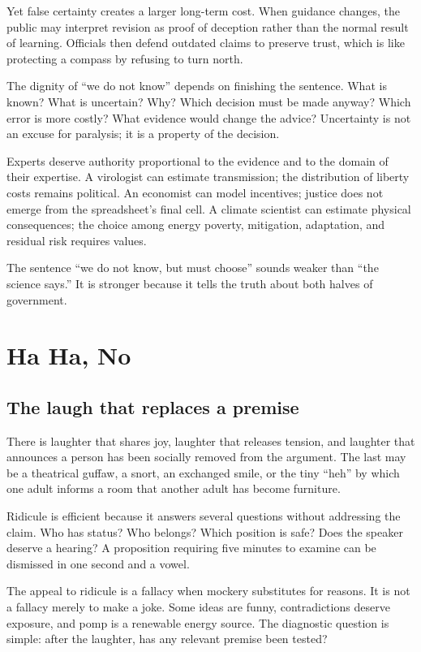 \documentclass[12pt,a4paper]{book}
\begin{document}
Yet false certainty creates a larger long-term cost.  When guidance changes,
the public may interpret revision as proof of deception rather than the normal
result of learning.  Officials then defend outdated claims to preserve trust,
which is like protecting a compass by refusing to turn north.

The dignity of ``we do not know'' depends on finishing the sentence.  What is
known?  What is uncertain?  Why?  Which decision must be made anyway?  Which
error is more costly?  What evidence would change the advice?  Uncertainty is
not an excuse for paralysis; it is a property of the decision.

Experts deserve authority proportional to the evidence and to the domain of
their expertise.  A virologist can estimate transmission; the distribution of
liberty costs remains political.  An economist can model incentives; justice
does not emerge from the spreadsheet's final cell.  A climate scientist can
estimate physical consequences; the choice among energy poverty, mitigation,
adaptation, and residual risk requires values.

The sentence ``we do not know, but must choose'' sounds weaker than ``the
science says.''  It is stronger because it tells the truth about both halves of
government.

\chapter{Ha Ha, No}
\label{chap:ha-ha-no}

\section{The laugh that replaces a premise}

There is laughter that shares joy, laughter that releases tension, and laughter
that announces a person has been socially removed from the argument.  The last
may be a theatrical guffaw, a snort, an exchanged smile, or the tiny ``heh'' by
which one adult informs a room that another adult has become furniture.

Ridicule is efficient because it answers several questions without addressing
the claim.  Who has status?  Who belongs?  Which position is safe?  Does the
speaker deserve a hearing?  A proposition requiring five minutes to examine
can be dismissed in one second and a vowel.

The appeal to ridicule is a fallacy when mockery substitutes for reasons.  It
is not a fallacy merely to make a joke.  Some ideas are funny, contradictions
deserve exposure, and pomp is a renewable energy source.  The diagnostic
question is simple: after the laughter, has any relevant premise been tested?
\end{document}

